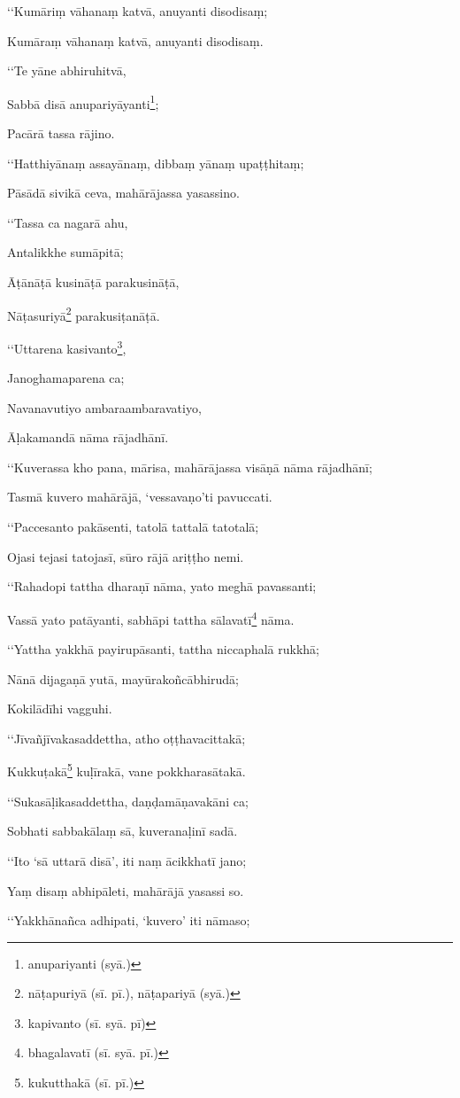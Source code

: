 ‘‘Kumāriṃ vāhanaṃ katvā, anuyanti disodisaṃ;

Kumāraṃ vāhanaṃ katvā, anuyanti disodisaṃ.

‘‘Te yāne abhiruhitvā,

Sabbā disā anupariyāyanti\footnote{anupariyanti (syā.)};

Pacārā tassa rājino.

‘‘Hatthiyānaṃ assayānaṃ, dibbaṃ yānaṃ upaṭṭhitaṃ;

Pāsādā sivikā ceva, mahārājassa yasassino.

‘‘Tassa ca nagarā ahu,

Antalikkhe sumāpitā;

Āṭānāṭā kusināṭā parakusināṭā,

Nāṭasuriyā\footnote{nāṭapuriyā (sī. pī.), nāṭapariyā (syā.)} parakusiṭanāṭā.

‘‘Uttarena kasivanto\footnote{kapivanto (sī. syā. pī)},

Janoghamaparena ca;

Navanavutiyo ambaraambaravatiyo,

Āḷakamandā nāma rājadhānī.

‘‘Kuverassa kho pana, mārisa, mahārājassa visāṇā nāma rājadhānī;

Tasmā kuvero mahārājā, ‘vessavaṇo’ti pavuccati.

‘‘Paccesanto pakāsenti, tatolā tattalā tatotalā;

Ojasi tejasi tatojasī, sūro rājā ariṭṭho nemi.

‘‘Rahadopi tattha dharaṇī nāma, yato meghā pavassanti;

Vassā yato patāyanti, sabhāpi tattha sālavatī\footnote{bhagalavatī (sī. syā. pī.)} nāma.

‘‘Yattha yakkhā payirupāsanti, tattha niccaphalā rukkhā;

Nānā dijagaṇā yutā, mayūrakoñcābhirudā;

Kokilādīhi vagguhi.

‘‘Jīvañjīvakasaddettha, atho oṭṭhavacittakā;

Kukkuṭakā\footnote{kukutthakā (sī. pī.)} kuḷīrakā, vane pokkharasātakā.

‘‘Sukasāḷikasaddettha, daṇḍamāṇavakāni ca;

Sobhati sabbakālaṃ sā, kuveranaḷinī sadā.

‘‘Ito ‘sā uttarā disā’, iti naṃ ācikkhatī jano;

Yaṃ disaṃ abhipāleti, mahārājā yasassi so.

‘‘Yakkhānañca adhipati, ‘kuvero’ iti nāmaso;

